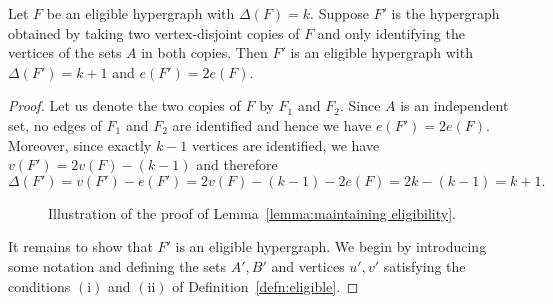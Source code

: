\begin{lemma}\label{lemma:maintaining eligibility}
Let $F$ be an eligible hypergraph with $\Delta(F)=k$. Suppose $F'$ is the hypergraph obtained by taking two vertex-disjoint copies of $F$ and only identifying the vertices of the sets $A$ in both copies. Then $F'$ is an eligible hypergraph with $\Delta(F')=k+1$ and $e(F')=2e(F)$.
\end{lemma}
\begin{proof}
Let us denote the two copies of $F$ by $F_1$ and $F_2$. Since $A$ is an independent set, no edges of $F_1$ and $F_2$ are identified and hence we have $e(F')=2e(F)$. Moreover, since exactly $k-1$ vertices are identified, we have $v(F')=2v(F)-(k-1)$ and therefore \[\Delta(F')=v(F')-e(F')=2v(F)-(k-1)-2e(F)=2k-(k-1)=k+1.\]

\begin{figure}[h!]
    \centering
    \caption{Illustration of the proof of Lemma~\ref{lemma:maintaining eligibility}.}
\end{figure}

It remains to show that $F'$ is an eligible hypergraph. We begin by introducing some notation and defining the sets $A', B'$ and vertices $u', v'$ satisfying the conditions $\mathrm{(i)}$ and $\mathrm{(ii)}$ of Definition~\ref{defn:eligible}.


\end{proof}
